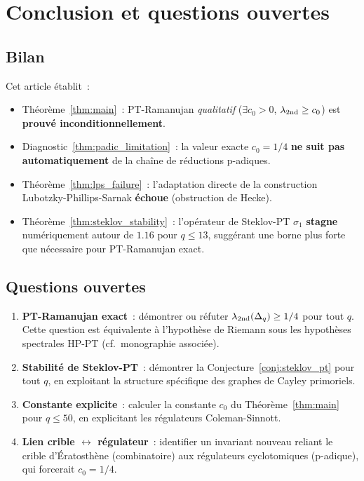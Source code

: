 \documentclass[11pt,a4paper]{article}
\theoremstyle{definition}
\begin{document}
\section{Conclusion et questions ouvertes}
\label{sec:conclusion}

\subsection{Bilan}

Cet article établit~:

\begin{itemize}
  \item Théorème~\ref{thm:main}~: PT-Ramanujan \emph{qualitatif}
        ($\exists c_0 > 0$, $\lambda_{\rm 2nd}\geq c_0$) est
        \textbf{prouvé inconditionnellement}.
  \item Diagnostic~\ref{thm:padic_limitation}~: la valeur exacte
        $c_0 = 1/4$ \textbf{ne suit pas automatiquement} de la chaîne
        de réductions p-adiques.
  \item Théorème~\ref{thm:lps_failure}~: l'adaptation directe de la
        construction Lubotzky-Phillips-Sarnak \textbf{échoue}
        (obstruction de Hecke).
  \item Théorème~\ref{thm:steklov_stability}~: l'opérateur de
        Steklov-PT $\sigma_1$ \textbf{stagne} numériquement autour
        de $1.16$ pour $q\leq 13$, suggérant une borne plus forte que
        nécessaire pour PT-Ramanujan exact.
\end{itemize}

\subsection{Questions ouvertes}

\begin{enumerate}
  \item \textbf{PT-Ramanujan exact}~: démontrer ou réfuter
        $\lambda_{\rm 2nd}(\Delta_q) \geq 1/4$ pour tout $q$. Cette
        question est équivalente à l'hypothèse de Riemann sous les
        hypothèses spectrales HP-PT (cf.\ monographie associée).
  \item \textbf{Stabilité de Steklov-PT}~: démontrer la
        Conjecture~\ref{conj:steklov_pt} pour tout $q$, en exploitant
        la structure spécifique des graphes de Cayley primoriels.
  \item \textbf{Constante explicite}~: calculer la constante $c_0$ du
        Théorème~\ref{thm:main} pour $q\leq 50$, en explicitant les
        régulateurs Coleman-Sinnott.
  \item \textbf{Lien crible $\leftrightarrow$ régulateur}~: identifier
        un invariant nouveau reliant le crible d'Ératosthène
        (combinatoire) aux régulateurs cyclotomiques (p-adique), qui
        forcerait $c_0 = 1/4$.
\end{enumerate}
\end{document}
